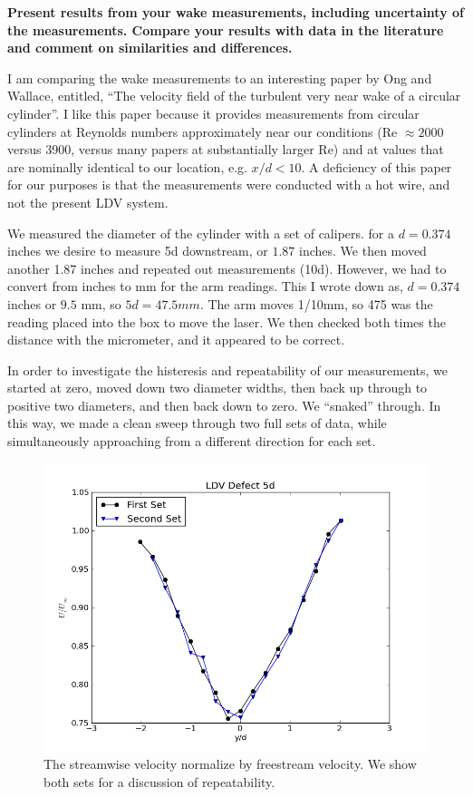 \documentclass{article}
\begin{document}
\textbf{Present results from your wake measurements, including
uncertainty of the measurements. Compare your results with data in the
literature and comment on similarities and differences. } 

I am comparing the wake measurements to an interesting paper by Ong and
Wallace, entitled, ``The velocity field of the turbulent very near wake
of a circular cylinder''. I like this paper because it provides
measurements from circular cylinders at Reynolds numbers approximately
near our conditions (Re $\approx 2000$ versus 3900, versus many papers
at substantially larger Re) and at values that are nominally identical
to our location, e.g. $x/d < 10$. A deficiency of this paper for our
purposes is that the measurements were conducted with a hot wire, and
not the present LDV system. 

We measured the diameter of the cylinder with a set of calipers. 
for a $d=0.374$ inches we desire to measure 5d downstream, or $1.87$
inches. We then moved another 1.87 inches and repeated out measurements
(10d). However, we had to convert from inches to mm for the arm
readings. This I wrote down as, $d=0.374$ inches or $9.5$ mm, so $5d =
47.5 mm$. The arm moves 1/10mm, so 475 was the reading placed into the
box to move the laser. We then checked both times the distance with the
micrometer, and it appeared to be correct. 

In order to investigate the histeresis and repeatability of our
measurements, we started at zero, moved down two diameter widths, then
back up through to positive two diameters, and then back down to
zero. We ``snaked'' through. In this way, we made a clean sweep through
two full sets of data, while simultaneously approaching from a different
direction for each set. 

\begin{figure}[!htb]
 \begin{center}
  \includegraphics[width = 12 cm]{figs/defect}
  \caption{The streamwise velocity normalize by freestream velocity. We
  show both sets for a discussion of repeatability.}
  \label{repeat}
 \end{center}
\end{figure}
\end{document}
